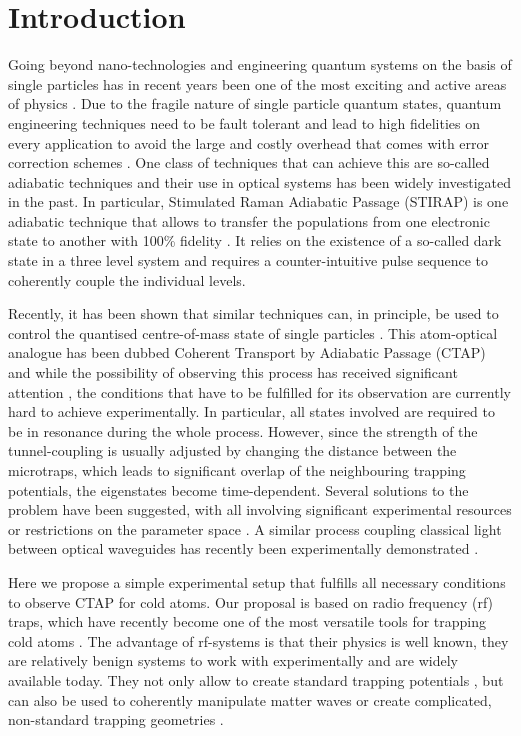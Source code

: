 
\section{Introduction}
\label{sec:Introduction}

Going beyond nano-technologies and engineering quantum systems on the
basis of single particles has in recent years been one of the most
exciting and active areas of physics \cite{Nielsen:00}. Due to the
fragile nature of single particle quantum states, quantum engineering
techniques need to be fault tolerant and lead to high fidelities on
every application to avoid the large and costly overhead that comes
with error correction schemes \cite{Steane:96}. One class of
techniques that can achieve this are so-called adiabatic techniques
and their use in optical systems has been widely investigated in the
past. In particular, Stimulated Raman Adiabatic Passage (STIRAP) is
one adiabatic technique that allows to transfer the populations from
one electronic state to another with 100\% fidelity
\cite{Bergmann:98}. It relies on the existence of a so-called dark
state in a three level system and requires a counter-intuitive pulse
sequence to coherently couple the individual levels.


Recently, it has been shown that similar techniques can, in principle,
be used to control the quantised centre-of-mass state of single
particles \cite{Eckert:04,Greentree:04,Eckert:06}. This atom-optical
analogue has been dubbed Coherent Transport by Adiabatic Passage
(CTAP) and while the possibility of observing this process has
received significant attention \cite{Rab:08,OSullivan:10}, the
conditions that have to be fulfilled for its observation are currently
hard to achieve experimentally. In particular, all states involved are
required to be in resonance during the whole process. However, since
the strength of the tunnel-coupling is usually adjusted by changing
the distance between the microtraps, which leads to significant
overlap of the neighbouring trapping potentials, the eigenstates
become time-dependent. Several solutions to the problem have been
suggested, with all involving significant experimental resources or
restrictions on the parameter space
\cite{Eckert:04,Eckert:06,Rab:08}. A similar process coupling
classical light between optical waveguides has recently been
experimentally demonstrated \cite{Longhi:06,Longhi:07,Rangelov:09}.


Here we propose a simple experimental setup that fulfills all
necessary conditions to observe CTAP for cold atoms.  Our proposal is
based on radio frequency (rf) traps, which have recently become one of
the most versatile tools for trapping cold atoms
\cite{Zobay:01,Schumm:05}. The advantage of rf-systems is that their
physics is well known, they are relatively benign systems to work with
experimentally and are widely available today. They not only allow to
create standard trapping potentials \cite{Zobay:01}, but can also be
used to coherently manipulate matter waves
\cite{Schumm:05,Hofferberth:07} or create complicated, non-standard
trapping geometries \cite{Courteille:06,Fernholz:07,Lesanovsky:06}.

